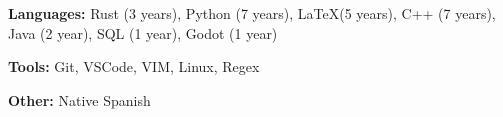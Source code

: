 \documentclass[../main.tex]{subfiles}
\begin{document}

 \textbf{Languages:} Rust (3 years), Python (7 years), \LaTeX (5 years), C++ (7 years), Java (2 year), SQL (1 year), Godot (1 year)

 \textbf{Tools:} Git, VSCode, VIM, Linux, Regex

 \textbf{Other:} Native Spanish 
\end{document}
